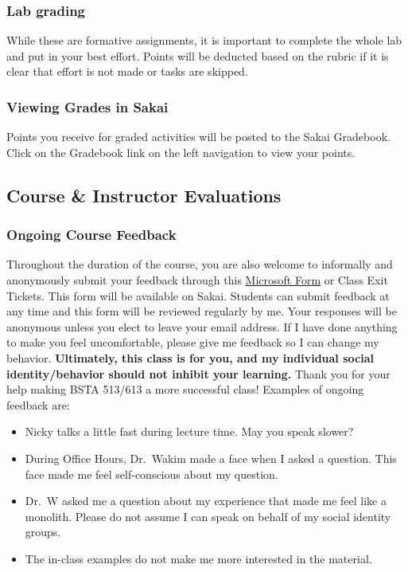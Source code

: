 \documentclass[
  letterpaper,
  DIV=11,
  numbers=noendperiod]{scrartcl}
\begin{document}
\hypertarget{lab-grading}{%
\subsubsection{Lab grading}\label{lab-grading}}

While these are formative assignments, it is important to complete the
whole lab and put in your best effort. Points will be deducted based on
the rubric if it is clear that effort is not made or tasks are skipped.

\hypertarget{viewing-grades-in-sakai}{%
\subsubsection{Viewing Grades in Sakai}\label{viewing-grades-in-sakai}}

Points you receive for graded activities will be posted to the Sakai
Gradebook. Click on the Gradebook link on the left navigation to view
your points.

\hypertarget{course-instructor-evaluations}{%
\subsection{Course \& Instructor
Evaluations}\label{course-instructor-evaluations}}

\hypertarget{ongoing-course-feedback}{%
\subsubsection{Ongoing Course Feedback}\label{ongoing-course-feedback}}

Throughout the duration of the course, you are also welcome to
informally and anonymously submit your feedback through this
\href{https://forms.office.com/Pages/ResponsePage.aspx?id=V3lz4rj6fk2U9pvWr59xWFMopmPUjRtDiHLswhgacNhUQlpLVUsyVUE3TU5ZNThJR0xCRDMyRjJOSC4u}{Microsoft
Form} or Class Exit Tickets. This form will be available on Sakai.
Students can submit feedback at any time and this form will be reviewed
regularly by me. Your responses will be anonymous unless you elect to
leave your email address. If I have done anything to make you feel
uncomfortable, please give me feedback so I can change my behavior.
\textbf{Ultimately, this class is for you, and my individual social
identity/behavior should not inhibit your learning.} Thank you for your
help making BSTA 513/613 a more successful class! Examples of ongoing
feedback are:

\begin{itemize}
\item
  Nicky talks a little fast during lecture time. May you speak slower?
\item
  During Office Hours, Dr.~Wakim made a face when I asked a question.
  This face made me feel self-conscious about my question.
\item
  Dr.~W asked me a question about my experience that made me feel like a
  monolith. Please do not assume I can speak on behalf of my social
  identity groups.
\item
  The in-class examples do not make me more interested in the material.
\end{itemize}
\end{document}
